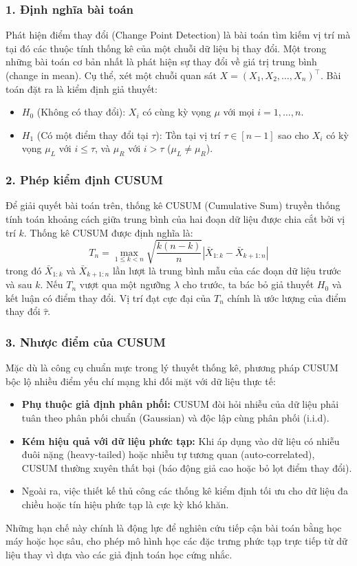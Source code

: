 \subsubsection*{1. Định nghĩa bài toán}
Phát hiện điểm thay đổi (Change Point Detection) là bài toán tìm kiếm vị trí mà tại đó các thuộc tính thống kê của một chuỗi dữ liệu bị thay đổi. 
Một trong những bài toán cơ bản nhất là phát hiện sự thay đổi về giá trị trung bình (change in mean). 
Cụ thể, xét một chuỗi quan sát $X = (X_1, X_2, \dots, X_n)^\top$. Bài toán đặt ra là kiểm định giả thuyết:
\begin{itemize}
    \item $H_0$ (Không có thay đổi): $X_i$ có cùng kỳ vọng $\mu$ với mọi $i = 1, \dots, n$.
    \item $H_1$ (Có một điểm thay đổi tại $\tau$): Tồn tại vị trí $\tau \in [n-1]$ sao cho $X_i$ có kỳ vọng $\mu_L$ 
    với $i \le \tau$, và $\mu_R$ với $i > \tau$ ($\mu_L \neq \mu_R$).
\end{itemize}

\subsubsection*{2. Phép kiểm định CUSUM}
Để giải quyết bài toán trên, thống kê CUSUM (Cumulative Sum) truyền thống tính toán khoảng cách giữa trung bình của hai đoạn dữ liệu được chia cắt bởi vị trí $k$. Thống kê CUSUM được định nghĩa là:
\begin{equation}
    T_n = \max_{1 \le k < n} \sqrt{\frac{k(n-k)}{n}} |\bar{X}_{1:k} - \bar{X}_{k+1:n}|
\end{equation}
trong đó $\bar{X}_{1:k}$ và $\bar{X}_{k+1:n}$ lần lượt là trung bình mẫu của các đoạn dữ liệu trước và sau $k$. Nếu $T_n$ vượt qua một ngưỡng $\lambda$ cho trước, ta bác bỏ giả thuyết $H_0$ và kết luận có điểm thay đổi. Vị trí đạt cực đại của $T_n$ chính là ước lượng của điểm thay đổi $\hat{\tau}$.

\subsubsection*{3. Nhược điểm của CUSUM}
Mặc dù là công cụ chuẩn mực trong lý thuyết thống kê, phương pháp CUSUM bộc lộ nhiều điểm yếu chí mạng khi đối mặt với dữ liệu thực tế:
\begin{itemize}
    \item \textbf{Phụ thuộc giả định phân phối:} CUSUM đòi hỏi nhiễu của dữ liệu phải tuân theo phân phối chuẩn (Gaussian) và độc lập cùng phân phối (i.i.d).
    \item \textbf{Kém hiệu quả với dữ liệu phức tạp:} Khi áp dụng vào dữ liệu có nhiễu đuôi nặng (heavy-tailed) hoặc nhiễu tự tương quan (auto-correlated), 
    CUSUM thường xuyên thất bại (báo động giả cao hoặc bỏ lọt điểm thay đổi). 
    \item Ngoài ra, việc thiết kế thủ công các thống kê kiểm định tối ưu cho dữ liệu đa chiều hoặc tín hiệu phức tạp là cực kỳ khó khăn.
\end{itemize}
Những hạn chế này chính là động lực để nghiên cứu tiếp cận bài toán bằng học máy hoặc học sâu, 
cho phép mô hình học các đặc trưng phức tạp trực tiếp từ dữ liệu thay vì dựa vào các giả định toán học cứng nhắc.

